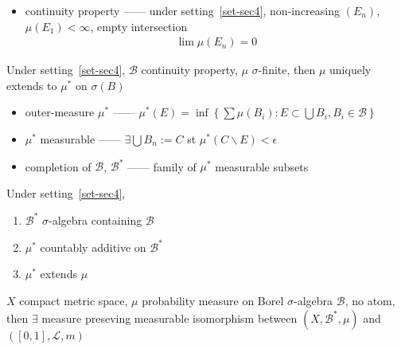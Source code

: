 \begin{itemize}
    \item continuity property ------ under setting~\ref{set-sec4}, non-increasing $(E_n)$, $\mu(E_1) < \infty$, empty intersection
    \begin{align*}
        \lim \mu(E_n) = 0
    \end{align*}
\end{itemize}

\begin{thm}
    Under setting~\ref{set-sec4}, $\mathcal{B}$ continuity property, $\mu$ $\sigma$-finite, then
    $\mu$ uniquely extends to $\mu^*$ on $\sigma(B)$
\end{thm}

\begin{itemize}
    \item outer-measure $\mu^*$ ------ $\mu^*(E) = \inf \left\{ \sum \mu(B_i) : E \subset \bigcup B_i, B_i \in \mathcal{B} \right\}$
    \item $\mu^*$ measurable ------ $\exists \bigcup B_n := C$ st $\mu^*(C \backslash E) < \epsilon$
    \item completion of $\mathcal{B}$, $\mathcal{B^*}$ ------ family of $\mu^*$ measurable subsets
\end{itemize}

\begin{prop}
    Under setting~\ref{set-sec4},
    \begin{enumerate}
        \item $\mathcal{B}^*$ $\sigma$-algebra containing $\mathcal{B}$
        \item $\mu^*$ countably additive on $\mathcal{B}^*$
        \item $\mu^*$ extends $\mu$
    \end{enumerate}
\end{prop}

\begin{myth}
    $X$ compact metric space, $\mu$ probability measure on Borel $\sigma$-algebra $\mathcal{B}$, no atom, then $\exists$
    measure preseving measurable isomorphism between $(X, \mathcal{B^*}, \mu)$ and $([0,1], \mathcal{L}, m)$
\end{myth}